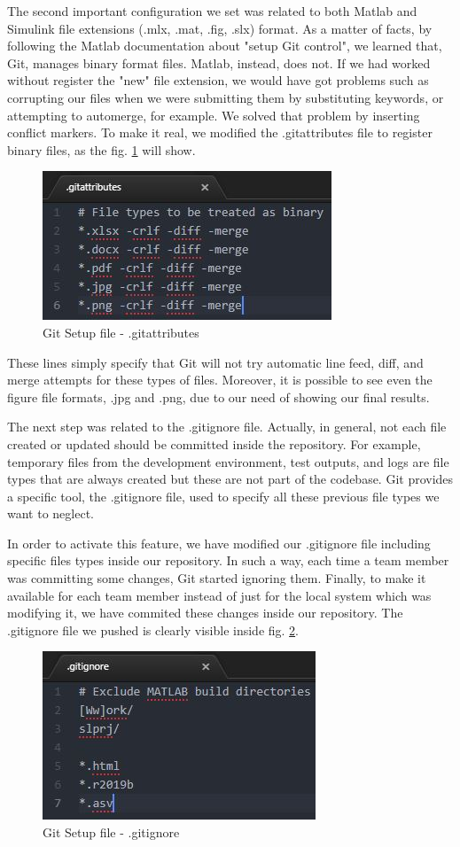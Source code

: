 The second important configuration we set was related to both Matlab and Simulink file extensions (.mlx, .mat, .fig, .slx) format. As a matter of facts, by following the Matlab documentation about "setup Git control", we learned that, Git, manages binary format files. Matlab, instead, does not. If we had worked without register the "new" file extension, we would have got problems such as corrupting our files when we were submitting them by substituting keywords, or attempting to automerge, for example. We solved that problem by inserting conflict markers. To make it real, we modified the .gitattributes file to register binary files, as the fig. \ref{gitattributes} will show. 
\begin{figure}
	\centering
	\includegraphics[scale=1]{../Images/VCS/Gitattributes.JPG}
	\caption{Git Setup file - .gitattributes}
	\label{gitattributes}
\end{figure}
These lines simply specify that Git will not try automatic line feed, diff, and merge attempts for these types of files. Moreover, it is possible to see even the figure file formats, .jpg and .png, due to our need of showing our final results.

The next step was related to the .gitignore file. Actually, in general, not each file created or updated should be committed inside the repository. For example, temporary files from the development environment, test outputs, and logs are file types that are always created but these are not part of the codebase. Git provides a specific tool, the .gitignore file, used to specify all these previous file types we want to neglect.

In order to activate this feature, we have modified our .gitignore file including specific files types inside our repository. In such a way, each time a team member was committing some changes, Git started ignoring them. Finally, to make it available for each team member instead of just for the local system which was modifying it, we have commited these changes inside our repository. The .gitignore file we pushed is clearly visible inside fig. \ref{gitignore}.
\begin{figure}
	\centering
	\includegraphics[scale=1]{../Images/VCS/Gitignore.JPG}
	\caption{Git Setup file - .gitignore}
	\label{gitignore}
\end{figure}
